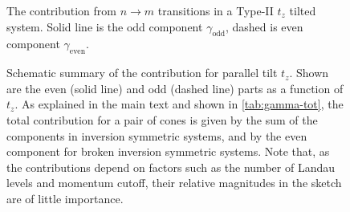 \begin{figure}[ht]
{
  } %
  \caption{The contribution from \( n\to m \) transitions in a Type-II \(t_z\) tilted system.
    Solid line is the odd component \( \gamma_{\text{odd}} \), dashed is even component \( \gamma_{\text{even}} \).
  }
  \label{fig:contribtzII}
\end{figure}

\begin{figure}[p]
  \centering
  \caption{
    Schematic summary of the contribution for parallel tilt \( t_z \).
    Shown are the even (solid line) and odd (dashed line) parts as a function of \( t_z \).
    As explained in the main text and shown in \cref{tab:gamma-tot}, the total contribution for a pair of cones is given by the sum of the components in inversion symmetric systems, and by the even component for broken inversion symmetric systems.
    Note that, as the contributions depend on factors such as the number of Landau levels and momentum cutoff, their relative magnitudes in the sketch are of little importance.
    \label{fig:scetch}
  }
\end{figure}

